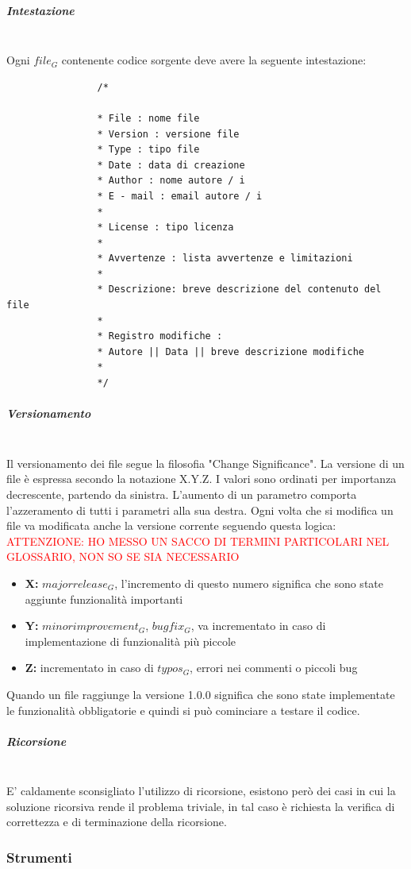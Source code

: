 			\subparagraph{Intestazione} \mbox{} \\
			Ogni $file_G$ contenente codice sorgente deve avere la seguente intestazione:
			\begin{lstlisting}
				/*
				
				* File : nome file
				* Version : versione file
				* Type : tipo file
				* Date : data di creazione
				* Author : nome autore / i
				* E - mail : email autore / i
				*
				* License : tipo licenza				
				*				
				* Avvertenze : lista avvertenze e limitazioni
				*
				* Descrizione: breve descrizione del contenuto del file
				*
				* Registro modifiche :
				* Autore || Data || breve descrizione modifiche
				*
				*/
			\end{lstlisting}
			\subparagraph{Versionamento} \mbox{} \\
			Il versionamento dei file segue la filosofia "Change Significance". La versione di un file è espressa secondo la notazione X.Y.Z. I valori sono ordinati per importanza decrescente, partendo da sinistra. L'aumento di un parametro comporta l'azzeramento di tutti i parametri alla sua destra. Ogni volta che si modifica un file va modificata anche la versione corrente seguendo questa logica:    
			\textcolor{red}{ATTENZIONE: HO MESSO UN SACCO DI TERMINI PARTICOLARI NEL GLOSSARIO, NON SO SE SIA NECESSARIO}  
			\begin{itemize}
				\item \textbf{X:} $major release_G$, l'incremento di questo numero significa che sono state aggiunte funzionalità importanti
				\item \textbf{Y:} $minor improvement_G$, $bugfix_G$, va incrementato in caso di implementazione di funzionalità più piccole
				\item \textbf{Z:} incrementato in caso di $typos_G$, errori nei commenti o piccoli bug
			\end{itemize}
			Quando un file raggiunge la versione 1.0.0 significa che sono state implementate le funzionalità obbligatorie e quindi si può cominciare a testare il codice.
			\subparagraph{Ricorsione} \mbox{} \\
			E' caldamente sconsigliato l'utilizzo di ricorsione, esistono però dei casi in cui la soluzione ricorsiva rende il problema triviale, in tal caso è richiesta la verifica di correttezza e di terminazione della ricorsione.
			
			
			
	\subsubsection{Strumenti}
